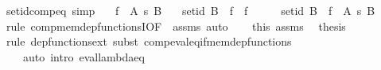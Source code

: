 \begin{isabellebody}
\isamarkupfalse%
%
\endisatagproof
{\isafoldproof}%
%
\isadelimproof
\isanewline
%
\endisadelimproof
\isanewline
{}\isamarkupfalse%
\ set{\isacharunderscore}{\kern0pt}id{\isacharunderscore}{\kern0pt}comp{\isacharunderscore}{\kern0pt}eq\ {\isacharbrackleft}{\kern0pt}simp{\isacharbrackright}{\kern0pt}{\isacharcolon}{\kern0pt}\isanewline
\ \ \ {\isachardoublequoteopen}f\ {\isasymin}\ A\ {\isasymrightarrow}s\ B{\isachardoublequoteclose}\isanewline
\ \ \ {\isachardoublequoteopen}set{\isacharunderscore}{\kern0pt}id\ B\ {\isasymcirc}\ f\ {\isacharequal}{\kern0pt}\ f{\isachardoublequoteclose}\isanewline
%
\isadelimproof
%
\endisadelimproof
%
\isatagproof
{}\isamarkupfalse%
\ {\isacharminus}{\kern0pt}\isanewline
\ \ \isamarkupfalse%
\ {\isachardoublequoteopen}set{\isacharunderscore}{\kern0pt}id\ B\ {\isasymcirc}\ f\ {\isasymin}\ A\ {\isasymrightarrow}s\ B{\isachardoublequoteclose}\isanewline
\ \ \ \ \isamarkupfalse%
\ {\isacharparenleft}{\kern0pt}rule\ comp{\isacharunderscore}{\kern0pt}mem{\isacharunderscore}{\kern0pt}dep{\isacharunderscore}{\kern0pt}functionsI{\isacharbrackleft}{\kern0pt}OF\ {\isacharunderscore}{\kern0pt}\ assms{\isacharbrackright}{\kern0pt}{\isacharparenright}{\kern0pt}\ auto\isanewline
\ \ \isamarkupfalse%
\ this\ assms\ \isamarkupfalse%
\ {\isacharquery}{\kern0pt}thesis\isanewline
\ \ \ \ \isamarkupfalse%
\ {\isacharparenleft}{\kern0pt}rule\ dep{\isacharunderscore}{\kern0pt}functions{\isacharunderscore}{\kern0pt}ext{\isacharcomma}{\kern0pt}\ subst\ comp{\isacharunderscore}{\kern0pt}eval{\isacharunderscore}{\kern0pt}eq{\isacharunderscore}{\kern0pt}if{\isacharunderscore}{\kern0pt}mem{\isacharunderscore}{\kern0pt}dep{\isacharunderscore}{\kern0pt}functions{\isacharparenright}{\kern0pt}\isanewline
\ \ \ \ {\isacharparenleft}{\kern0pt}auto\ intro{\isacharcolon}{\kern0pt}\ eval{\isacharunderscore}{\kern0pt}lambda{\isacharunderscore}{\kern0pt}eq{\isacharparenright}{\kern0pt}\isanewline
{}\isamarkupfalse%
%
\endisatagproof
{\isafoldproof}%
%
\isadelimproof
\isanewline
%
\endisadelimproof
\isanewline
%
\isadelimtheory
\isanewline
%
\endisadelimtheory
%
\isatagtheory
{}\isamarkupfalse%
%
\endisatagtheory
{\isafoldtheory}%
%
\isadelimtheory
%
\endisadelimtheory
%
\end{isabellebody}%
\endinput
